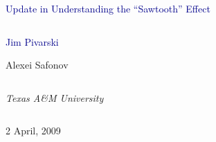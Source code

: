 \documentclass[compress]{beamer}
\begin{document}
\begin{frame}
\vfill
\begin{center}
\textcolor{darkblue}{\Large Update in Understanding the ``Sawtooth'' Effect}

\vfill
\begin{columns}
\begin{center}
\large
\textcolor{darkblue}{Jim Pivarski}

\vspace{0.2 cm}
Alexei Safonov
\end{center}
\end{columns}

\begin{columns}
\begin{center}
\scriptsize
{\it Texas A\&M University}
\end{center}
\end{columns}

\vfill
 2 April, 2009

\end{center}
\end{frame}


\small
\end{document}

